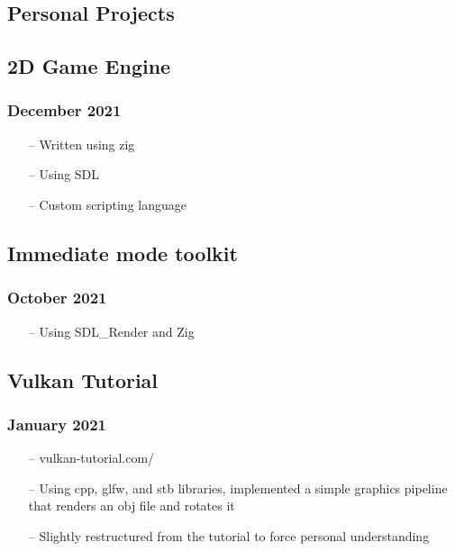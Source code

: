 \documentclass[11pt]{article}
\begin{document}
\begin{multicols}{2}
\columnbreak

\section{Personal Projects}

\subsection{2D Game Engine}
\subsubsection{December 2021}
\begin{itemize}[noitemsep, topsep=0pt]
	\item[--] Written using zig
	\item[--] Using SDL
	\item[--] Custom scripting language
\end{itemize}

\subsection{Immediate mode toolkit}
\subsubsection{October 2021}
\begin{itemize}[noitemsep, topsep=0pt]
	\item[--] Using SDL\_Render and Zig
\end{itemize}

\subsection{Vulkan Tutorial}
\subsubsection{January 2021}
\begin{itemize}[noitemsep, topsep=0pt]
    \item[--] vulkan-tutorial.com/
	\item[--] Using cpp, glfw, and stb libraries, implemented a simple
        graphics pipeline that renders an obj file and rotates it
	\item[--] Slightly restructured from the tutorial 
        to force personal understanding
\end{itemize}

\end{multicols}
\end{document}
